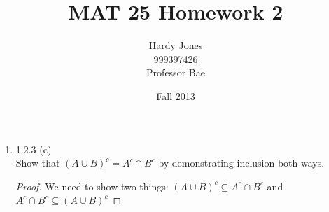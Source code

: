 \documentclass[12pt,letterpaper]{article}
\title{MAT 25 Homework 2\vspace{-2ex}}
\author{Hardy Jones\\
        999397426\\
        Professor Bae\vspace{-2ex}}
\date{Fall 2013}
\begin{document}
  \maketitle

  \begin{enumerate}
    \item 1.2.3 (c) \\
      Show that $(A \cup B)^c = A^c \cap B^c$
      by demonstrating inclusion both ways.

      \begin{proof}
        We need to show  two things:
        $(A \cup B)^c \subseteq A^c \cap B^c$
        and
        $A^c \cap B^c \subseteq (A \cup B)^c$
      \end{proof}
  \end{enumerate}
\end{document}
